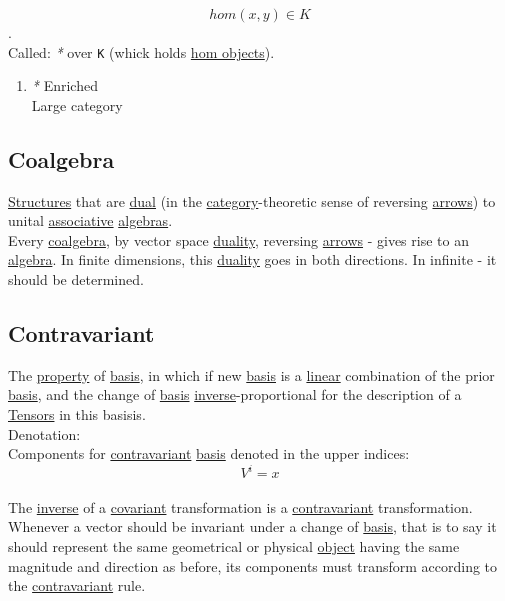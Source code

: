 \documentclass[11pt]{article}
\begin{document}
$$ hom(x,y) \in K $$.\\

Called: \emph{*} over \texttt{K} (whick holds \hyperref[orgf5433c2]{hom objects}).\\

\begin{enumerate}
\item \emph{*}
\label{sec:org250923d}
\label{org56a3665}Enriched\\
\label{orgfd13aff}Large category\\
\end{enumerate}

\subsection{\label{orgf6509c0}Coalgebra}
\label{sec:orgc247fc3}
\hyperref[org51d1eff]{Structures} that are \hyperref[org0a6da4c]{dual} (in the \hyperref[org3e3a79b]{category}-theoretic sense of reversing \hyperref[org33f3f3f]{arrows}) to unital \hyperref[org31bffbb]{associative} \hyperref[org238196c]{algebras}.\\
Every \hyperref[orgf6509c0]{coalgebra}, by vector space \hyperref[org724a3ee]{duality}, reversing \hyperref[org33f3f3f]{arrows} - gives rise to an \hyperref[orgecde2fc]{algebra}. In finite dimensions, this \hyperref[org724a3ee]{duality} goes in both directions. In infinite - it should be determined.\\

\subsection{\label{org47a73bb}Contravariant}
\label{sec:org37fdf27}
The \hyperref[org07ca26b]{property} of \hyperref[org5650c52]{basis}, in which if new \hyperref[org5650c52]{basis} is a \hyperref[orgb55e183]{linear} combination of the prior \hyperref[org5650c52]{basis}, and the change of \hyperref[org5650c52]{basis} \hyperref[org41275e7]{inverse}-proportional for the description of a \hyperref[org1fdd1da]{Tensors} in this basisis.\\

Denotation:\\
Components for \hyperref[org47a73bb]{contravariant} \hyperref[org5650c52]{basis} denoted in the upper indices:\\
$$ V^{i} = x $$\\

The \hyperref[org41275e7]{inverse} of a \hyperref[orgf529c7b]{covariant} transformation is a \hyperref[org47a73bb]{contravariant} transformation. Whenever a vector should be invariant under a change of \hyperref[org5650c52]{basis}, that is to say it should represent the same geometrical or physical \hyperref[org025aac8]{object} having the same magnitude and direction as before, its components must transform according to the \hyperref[org47a73bb]{contravariant} rule.\\
\end{document}
